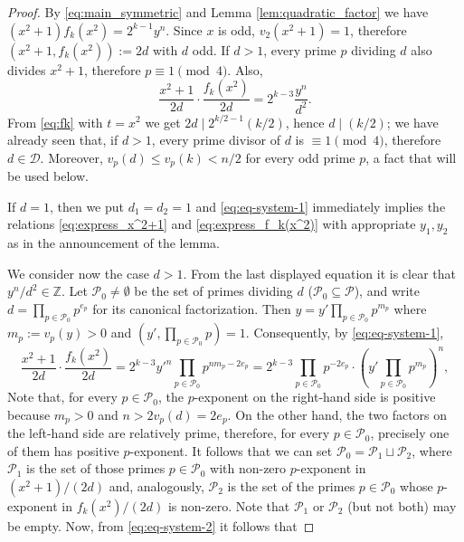 \documentclass[12pt]{amsart}
\numberwithin{equation}{section}
\theoremstyle{definition}
\theoremstyle{remark}
\newcommand{\ZZ}{\mathbb{Z}}
\newcommand{\cD}{\mathcal{D}}
\newcommand{\cP}{\mathcal{P}}
\begin{document}
\begin{proof}
By \eqref{eq:main_symmetric} and  Lemma \ref{lem:quadratic_factor} we have $(x^2+1)f_k(x^2)=2^{k-1}y^n$. Since $x$ is odd, $v_2(x^2+1)=1$, therefore $(x^2+1,f_k(x^2)):=2d$ with $d$ odd. If $d>1$, every prime $p$ dividing $d$ also divides $x^2+1$, therefore $p\equiv 1\pmod 4$. Also,
\begin{equation} \label{eq:eq-system-1}
    \frac{x^2+1}{2d}\cdot\frac{f_k(x^2)}{2d}=2^{k-3}\frac{y^n}{d^2}.
\end{equation}
From \eqref{eq:fk} with $t=x^2$ we get $2d\mid 2^{k/2-1}(k/2)$, hence $d\mid (k/2)$; we have already seen that, if $d>1$, every prime divisor of $d$ is $\equiv 1\pmod 4$, therefore $d\in \cD$. Moreover, $v_p(d)\le v_p(k)<n/2$ for every odd prime $p$, a fact that will be used below.

If $d=1$, then we put $d_1=d_2=1$ and \eqref{eq:eq-system-1} 
immediately implies the relations \eqref{eq:express_x^2+1} and
\eqref{eq:express_f_k(x^2)} with appropriate $y_1,y_2$ as in
the announcement of the lemma.

We consider now the case $d>1$.
From the last displayed equation it is clear that $y^n/d^2\in\ZZ$. 
Let $\cP_0\neq\emptyset$ be the set of primes dividing $d$ 
($\cP_0\subseteq\cP$), and write 
$d=\prod_{p\in \cP_0}p^{e_p}$ for its canonical factorization. 
Then $y=y'\prod_{p\in \cP_0}p^{m_p}$  where $m_p:=v_{p}(y)>0$ and  
$(y',\prod_{p\in \cP_0}p)=1$. Consequently, by \eqref{eq:eq-system-1},
%
\begin{equation} \label{eq:eq-system-2}
    \frac{x^2+1}{2d}\cdot\frac{f_k(x^2)}{2d}= 
 2^{k-3}y'^n\prod_{p\in \cP_0}p^{nm_p-2e_p}
=2^{k-3}\prod_{p\in \cP_0}p^{-2e_p}\cdot
\left(y'\prod_{p\in \cP_0}p^{m_p}\right)^n,
\end{equation}
%
Note that, for every $p\in \cP_0$, the $p$-exponent on the right-hand side is positive because $m_p>0$ and $n>2v_p(d)=2e_p$. On the other hand, the two factors on the left-hand side are relatively prime, therefore, for every $p\in \cP_0$, precisely one of them has positive $p$-exponent. It follows that we can set  $\cP_0=\cP_1\sqcup \cP_2$, where $\cP_1$ is the set of those primes $p\in \cP_0$ with non-zero $p$-exponent in $(x^2+1)/(2d)$ and, analogously, $\cP_2$ is the set of the primes $p\in \cP_0$ whose $p$-exponent in $f_k(x^2)/(2d)$ is non-zero. Note that $\cP_1$ or $\cP_2$ (but not both) may be empty. Now, from \eqref{eq:eq-system-2} it follows that 


\end{proof}
\end{document}
